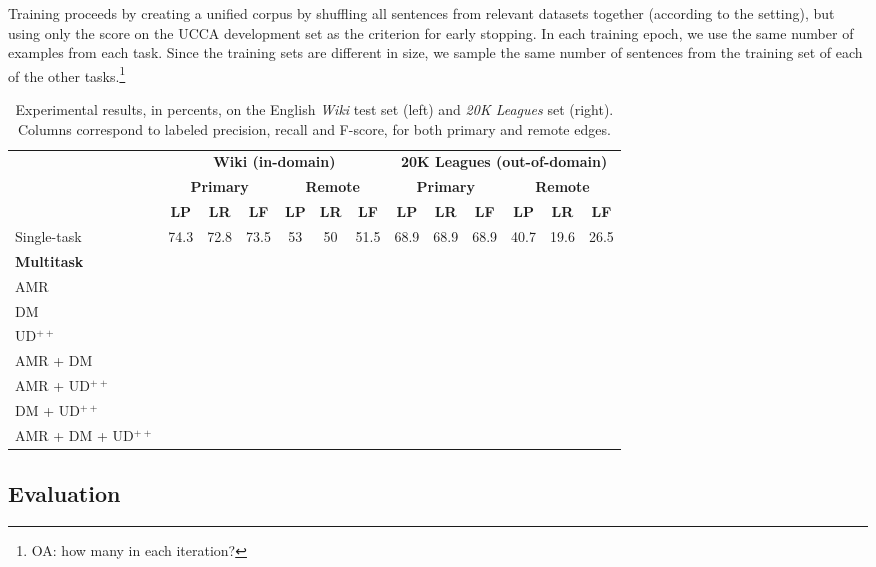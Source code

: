 \documentclass[11pt,a4paper]{article}
\newcommand{\oa}[1]{\footnote{\color{red}OA: #1}}
\begin{document}
Training proceeds by creating a unified corpus by shuffling all sentences from relevant
datasets together (according to the setting),
but using only the score on the UCCA development set as the criterion for early stopping.
In each training epoch, we use the same number of examples from each task.
Since the training sets are different in size, we sample the same number of sentences from
the training set of each of the other tasks.\oa{how many in each iteration?}

\begin{table*}
\centering
\begin{tabular}{l|ccc|ccc||ccc|ccc}
& \multicolumn{6}{c||}{\footnotesize \bf Wiki (in-domain)}
& \multicolumn{6}{c}{\footnotesize \bf 20K Leagues (out-of-domain)} \\
& \multicolumn{3}{c|}{\footnotesize \bf Primary} & \multicolumn{3}{c||}{\footnotesize \bf Remote}
& \multicolumn{3}{c|}{\footnotesize \bf Primary} & \multicolumn{3}{c}{\footnotesize \bf Remote} \\
& \footnotesize \textbf{LP} & \footnotesize \textbf{LR} & \footnotesize \textbf{LF}
& \footnotesize \textbf{LP} & \footnotesize \textbf{LR} & \footnotesize \textbf{LF}
& \footnotesize \textbf{LP} & \footnotesize \textbf{LR} & \footnotesize \textbf{LF}
& \footnotesize \textbf{LP} & \footnotesize \textbf{LR} & \footnotesize \textbf{LF} \\
\hline
Single-task
& 74.3 & 72.8 & 73.5 & 53 & 50 & 51.5 & 68.9 & 68.9 & 68.9 & 40.7 & 19.6 & 26.5 \\
\hline
\small \bf Multitask &&&&&&&&& \\
AMR \\
DM \\
UD$^{++}$ \\
AMR + DM \\
AMR + UD$^{++}$ \\
DM + UD$^{++}$ \\
AMR + DM + UD$^{++}$ 
\end{tabular}
\caption{
Experimental results, in percents, on the English \textit{Wiki} test set (left)
and \textit{20K Leagues} set (right).
Columns correspond to labeled precision, recall and F-score,
for both primary and remote edges.
}
\label{tab:results}
\end{table*}


\subsection{Evaluation}\label{sec:evaluation}
\end{document}
